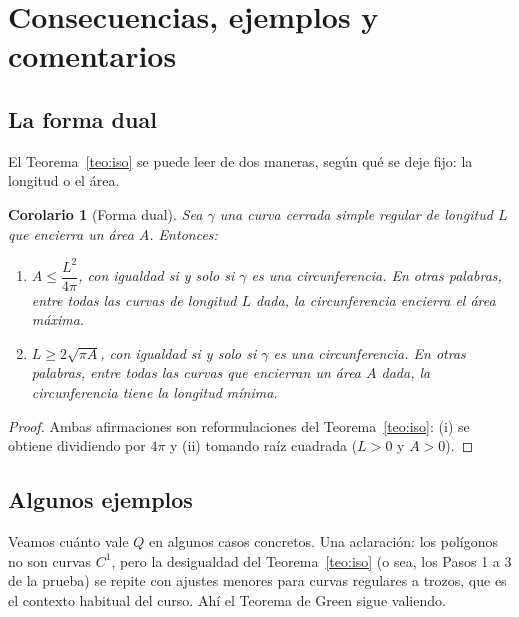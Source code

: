 \documentclass[12pt,a4paper]{article}
\theoremstyle{profesional}
\newtheorem{corolario}[teorema]{Corolario}
\theoremstyle{definicion-style}
\begin{document}
\section{Consecuencias, ejemplos y comentarios}\label{sec:consecuencias}

\subsection{La forma dual}

El Teorema~\ref{teo:iso} se puede leer de dos maneras, según qué se deje fijo: la longitud o el área.

\begin{corolario}[Forma dual]
    Sea \( \gamma \) una curva cerrada simple regular de longitud \( L \) que encierra un área \( A \). Entonces:
    \begin{enumerate}[label=(\roman*)]
        \item \( A \leq \dfrac{L^2}{4\pi} \), con igualdad si y solo si \( \gamma \) es una circunferencia. En otras palabras, entre todas las curvas de longitud \( L \) dada, la circunferencia encierra el área máxima.
        \item \( L \geq 2\sqrt{\pi A} \), con igualdad si y solo si \( \gamma \) es una circunferencia. En otras palabras, entre todas las curvas que encierran un área \( A \) dada, la circunferencia tiene la longitud mínima.
    \end{enumerate}
\end{corolario}
\begin{proof}
    Ambas afirmaciones son reformulaciones del Teorema~\ref{teo:iso}: (i) se obtiene dividiendo por \( 4\pi \) y (ii) tomando raíz cuadrada (\( L > 0 \) y \( A > 0 \)).
\end{proof}

\subsection{Algunos ejemplos}

Veamos cuánto vale \( Q \) en algunos casos concretos. Una aclaración: los polígonos no son curvas \( C^1 \), pero la desigualdad del Teorema~\ref{teo:iso} (o sea, los Pasos 1 a 3 de la prueba) se repite con ajustes menores para curvas regulares a trozos,
que es el contexto habitual del curso. Ahí el Teorema de Green sigue valiendo.
\end{document}

